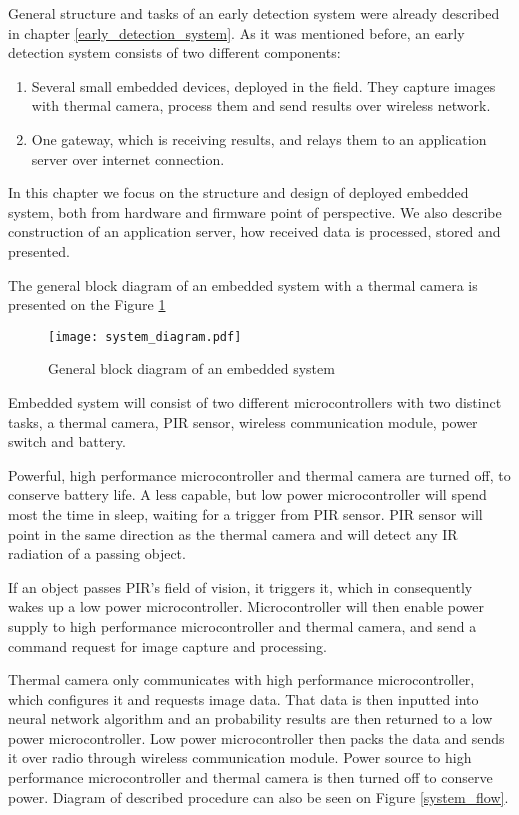 General structure and tasks of an early detection system were already described in chapter \ref{early_detection_system}.
As it was mentioned before, an early detection system consists of two different components:

\begin{enumerate} 
    \item Several small embedded devices, deployed in the field. They capture images with thermal camera, process them and send results over wireless network.
    \item One gateway, which is receiving results, and relays them to an application server over internet connection.
\end{enumerate} 

In this chapter we focus on the structure and design of deployed embedded system, both from hardware and firmware point of perspective.
We also describe construction of an application server, how received data is processed, stored and presented.

The general block diagram of an embedded system with a thermal camera is presented on the Figure \ref{system_diagram} 

\begin{figure}[ht]
        \centering
        \texttt{[image: system\_diagram.pdf]} 
        \caption{ General block diagram of an embedded system}
        \label{system_diagram}
\end{figure}

Embedded system will consist of two different microcontrollers with two distinct tasks, a thermal camera, PIR sensor, wireless communication module, power switch and battery.

Powerful, high performance microcontroller and thermal camera are turned off, to conserve battery life.
A less capable, but low power microcontroller will spend most the time in sleep, waiting for a trigger from PIR sensor.
PIR sensor will point in the same direction as the thermal camera and will detect any IR radiation of a passing object.

If an object passes PIR's field of vision, it triggers it, which in consequently wakes up a low power microcontroller.
Microcontroller will then enable power supply to high performance microcontroller and thermal camera, and send a command request for image capture and processing.

Thermal camera only communicates with high performance microcontroller, which configures it and requests image data.
That data is then inputted into neural network algorithm and an probability results are then returned to a low power microcontroller.
Low power microcontroller then packs the data and sends it over radio through wireless communication module.
Power source to high performance microcontroller and thermal camera is then turned off to conserve power.
Diagram of described procedure can also be seen on Figure \ref{system_flow}.

